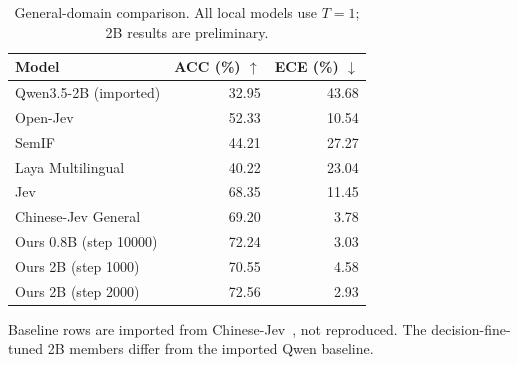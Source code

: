\begin{table}[t]
\centering
\footnotesize
\setlength{\tabcolsep}{4pt}
\caption{General-domain comparison. All local models use $T=1$; 2B results are preliminary.}
\label{tab:general}
\begin{tabular}{lrr}
\toprule
Model & ACC (\%) $\uparrow$ & ECE (\%) $\downarrow$ \\
\midrule
Qwen3.5-2B (imported) & 32.95 & 43.68 \\
Open-Jev & 52.33 & 10.54 \\
SemIF & 44.21 & 27.27 \\
Laya Multilingual & 40.22 & 23.04 \\
Jev & 68.35 & 11.45 \\
Chinese-Jev General & 69.20 & 3.78 \\
Ours 0.8B (step 10000) & 72.24 & 3.03 \\
Ours 2B (step 1000) & 70.55 & 4.58 \\
Ours 2B (step 2000) & 72.56 & 2.93 \\
\bottomrule
\end{tabular}
\par\vspace{3pt}\begin{minipage}{\columnwidth}\footnotesize Baseline rows are imported from Chinese-Jev~\citep{wang2026chinesejev}, not reproduced. The decision-fine-tuned 2B members differ from the imported Qwen baseline.\end{minipage}
\end{table}
